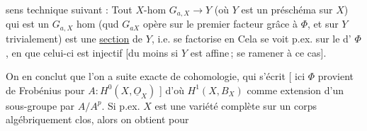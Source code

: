 sens technique suivant : Tout $X$-hom $G_{a,X}\mathrel{\longrightarrow}Y$ (où $Y$ est un préschéma sur $X$) qui est un $G_{a,X}$ hom (qud $G_{aX}$ opère sur le premier facteur grâce à $\Phi$, et sur $Y$ trivialement) est une \uline{section} de $Y$, i.e. se factorise en
Cela se voit p.ex. sur le   d' $\Phi$, en  que celui-ci est injectif [du moins si $Y$ est affine\,;   se ramener  à ce cas].

On en conclut que l'on a   suite exacte de cohomologie, qui s'écrit
[ ici $\Phi$ provient de Frobénius    pour $A\colon H^0(X,\underline O_X)$ ] d'où $H^1(X,B_X)$ comme extension d'un  sous-groupe   par $A/A^p$. Si p.ex.
$X$ est une variété complète sur un corps algébriquement clos, alors on obtient pour
